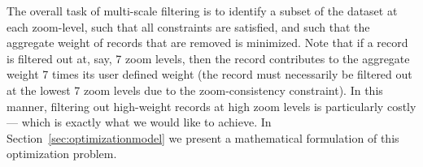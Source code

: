 The overall task of multi-scale filtering is to identify a subset of the dataset at each zoom-level, such that all constraints are satisfied, and such that the aggregate weight of records that are removed is minimized. Note that if a record is filtered out at, say, 7 zoom levels, then the record contributes to the aggregate weight 7 times its user defined weight (the record must necessarily be filtered out at the lowest 7 zoom levels due to the zoom-consistency constraint). In this manner, filtering out high-weight records at high zoom levels is particularly costly --- which is exactly what we would like to achieve. In Section~\ref{sec:optimizationmodel} we present a mathematical formulation of this optimization problem.
